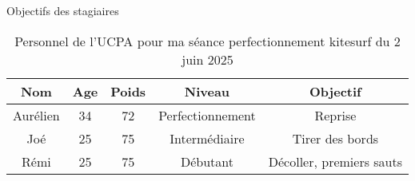 \documentclass[10pt,a4paper]{beamer}
\begin{document}

\begin{frame}{Objectifs des stagiaires}
\begin{table}
\centering
\begin{tabular}{|c|c|c|c|c|}
        \hline
        \textbf{Nom} & \textbf{Age} & \textbf{Poids}& \textbf{Niveau}     &  \textbf{Objectif} \\ 
        \hline
        Aurélien      &  34          &  72           &   Perfectionnement  & Reprise \\
        Joé           &  25          &  75           &   Intermédiaire     & Tirer des bords \\
        Rémi          &  25          & 75            &  Débutant           &  Décoller, premiers sauts  \\
        \hline
\end{tabular}
\caption{Personnel de l'UCPA pour ma séance perfectionnement kitesurf du 2 juin 2025}
\end{table}
\end{frame}
\end{document}
